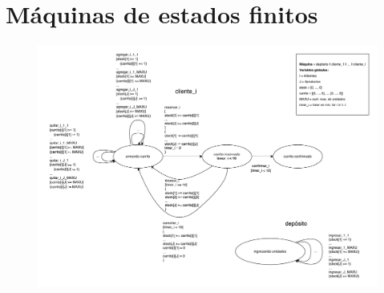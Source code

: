 \section{Máquinas de estados finitos}

\begin{figure}[H]
  \begin{center}
  \includegraphics[angle=90,height=\textheight]{tp2/images/fsm.pdf}
  \end{center}
\end{figure}
